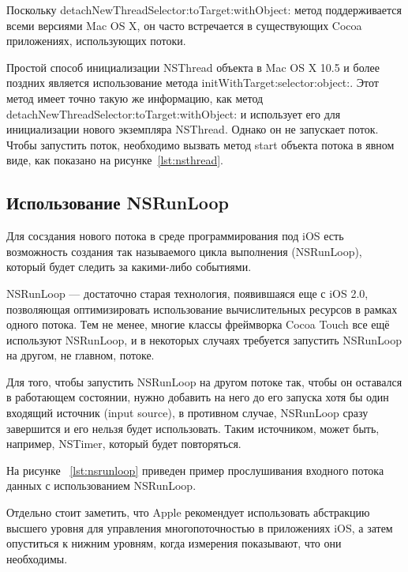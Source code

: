 Поскольку detachNewThreadSelector:toTarget:withObject: метод поддерживается
всеми версиями Mac OS X, он часто встречается в существующих Cocoa приложениях,
использующих потоки.

Простой способ инициализации NSThread объекта в Mac OS X 10.5 и более поздних
является использование метода initWithTarget:selector:object:. Этот метод
имеет точно такую ​​же информацию, как метод detachNewThreadSelector:toTarget:withObject:
и использует его для инициализации нового экземпляра NSThread. Однако он не
запускает поток. Чтобы запустить поток, необходимо вызвать метод start
объекта потока в явном виде, как показано на рисунке~\ref{lst:nsthread}.



\subsection{Использование NSRunLoop}

Для сосздания нового потока в среде программирования под iOS есть возможность
создания так называемого цикла выполнения (NSRunLoop), который будет следить за какими-либо
событиями.

NSRunLoop --- достаточно старая технология, появившаяся еще с iOS 2.0,
позволяющая оптимизировать использование вычислительных ресурсов в рамках одного потока.
Тем не менее, многие классы фреймворка Cocoa Touch все ещё используют NSRunLoop,
и в некоторых случаях требуется запустить NSRunLoop на другом, не главном, потоке.

Для того, чтобы запустить NSRunLoop на другом потоке так, чтобы он оставался
в работающем состоянии, нужно добавить на него до его запуска хотя бы один
входящий источник (input source), в противном случае, NSRunLoop сразу завершится
и его нельзя будет использовать. Таким источником, может быть, например, NSTimer,
который будет повторяться.

На рисунке ~\ref{lst:nsrunloop} приведен пример прослушивания входного потока данных
с использованием NSRunLoop.


Отдельно стоит заметить, что Apple рекомендует использовать абстракцию
высшего уровня для управления многопоточностью в приложениях iOS,
а затем опуститься к нижним уровням, когда измерения показывают,
что они необходимы.

\pagebreak
